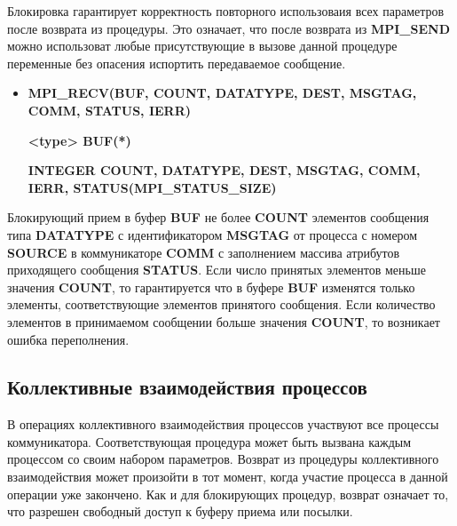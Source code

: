 \documentclass[14pt,a4paper,report]{ncc}
\begin{document}
Блокировка гарантирует корректность повторного использоваия всех параметров после возврата из процедуры. Это означает, что после возврата из \textbf{MPI\_SEND} можно использоват любые присутствующие в вызове данной процедуре переменные без опасения испортить передаваемое сообщение.
\begin{itemize}
\item\textbf{MPI\_RECV(BUF, COUNT, DATATYPE, DEST, MSGTAG,\\ COMM,
 STATUS, IERR)}
\

\textbf{<type> BUF(*)}
\

\textbf{INTEGER COUNT, DATATYPE, DEST, MSGTAG, COMM, IERR, STATUS(MPI\_STATUS\_SIZE)}
\
\end{itemize}
Блокирующий прием в буфер \textbf{BUF} не более \textbf{COUNT} элементов сообщения типа \textbf{DATATYPE} с идентификатором \textbf{MSGTAG} от процесса с номером \textbf{SOURCE} в коммуникаторе \textbf{COMM} с заполнением массива атрибутов приходящего сообщения \textbf{STATUS}. Если число принятых элементов меньше значения \textbf{COUNT}, то гарантируется что в буфере \textbf{BUF} изменятся только элементы, соответствующие элементов принятого сообщения. Если количество элементов в принимаемом сообщении больше значения \textbf{COUNT}, то возникает ошибка переполнения.

\subsection{Коллективные взаимодействия процессов}
В операциях коллективного взаимодействия процессов участвуют все процессы коммуникатора. Соответствующая процедура может быть вызвана каждым процессом со своим набором параметров. Возврат из процедуры коллективного взаимодействия может произойти в тот момент, когда участие процесса в данной операции уже закончено. Как и для блокирующих процедур, возврат означает то, что разрешен свободный доступ к буферу приема или посылки.
\
\end{document}

